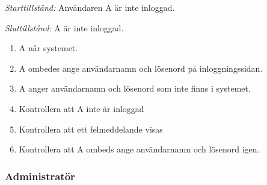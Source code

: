 \documentclass[a4paper]{article}
\begin{document}
\begin{ST}
\emph{Starttillstånd:} Användaren A är inte inloggad.

\emph{Sluttillstånd:} A är inte inloggad.

\begin{enumerate}
\item A når systemet.
\item A ombedes ange användarnamn och lösenord på inloggningssidan.
\item A anger användarnamn och lösenord som inte finns i systemet.
\item Kontrollera att A inte är inloggad
\item Kontrollera att ett felmeddelande visas
\item Kontrollera att A ombeds ange användarnamn och lösenord igen.
\end{enumerate}

\end{ST}

\subsubsection{Administratör}
\end{document}
